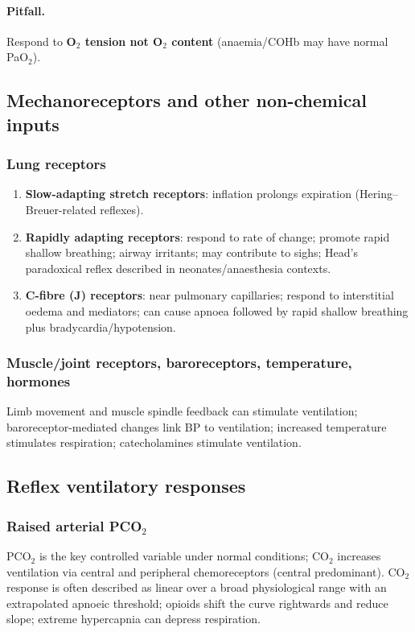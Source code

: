 \documentclass[11pt,a4paper]{article}
\begin{document}
\paragraph{Pitfall.}
Respond to \textbf{O$_2$ tension not O$_2$ content} (anaemia/COHb may have normal PaO$_2$).

\subsection{Mechanoreceptors and other non-chemical inputs}
\subsubsection{Lung receptors}
\begin{enumerate}
  \item \textbf{Slow-adapting stretch receptors}: inflation prolongs expiration (Hering--Breuer-related reflexes).
  \item \textbf{Rapidly adapting receptors}: respond to rate of change; promote rapid shallow breathing; airway irritants; may contribute to sighs; Head's paradoxical reflex described in neonates/anaesthesia contexts.
  \item \textbf{C-fibre (J) receptors}: near pulmonary capillaries; respond to interstitial oedema and mediators; can cause apnoea followed by rapid shallow breathing plus bradycardia/hypotension.
\end{enumerate}

\subsubsection{Muscle/joint receptors, baroreceptors, temperature, hormones}
Limb movement and muscle spindle feedback can stimulate ventilation; baroreceptor-mediated changes link BP to ventilation; increased temperature stimulates respiration; catecholamines stimulate ventilation.

\subsection{Reflex ventilatory responses}
\subsubsection{Raised arterial PCO$_2$}
PCO$_2$ is the key controlled variable under normal conditions; CO$_2$ increases ventilation via central and peripheral chemoreceptors (central predominant). CO$_2$ response is often described as linear over a broad physiological range with an extrapolated apnoeic threshold; opioids shift the curve rightwards and reduce slope; extreme hypercapnia can depress respiration.
\end{document}
